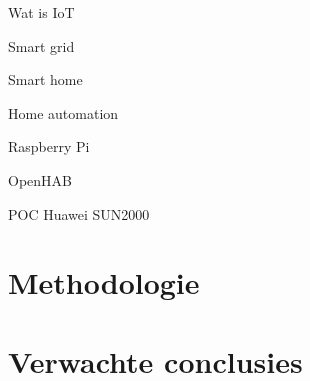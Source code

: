 \documentclass{hogent-article}
\begin{document}
    
    
    
    
    
    Wat is IoT
    
    Smart grid
    
    Smart home
    
    Home automation
    
    Raspberry Pi
    
    OpenHAB
    
    POC Huawei SUN2000
    
    
    \section{Methodologie}
    
    
    \lipsum[10-12]
    
    \section{Verwachte conclusies}
    
    
    \lipsum[14-18]
    
    
    \printbibliography[heading=bibintoc]
    
\end{document}

